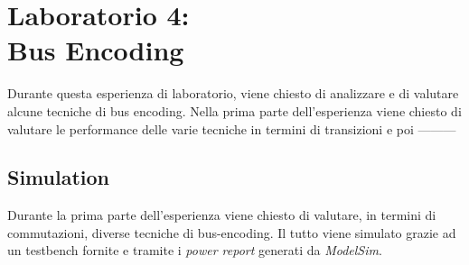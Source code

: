 \chapter{Laboratorio 4: \\Bus Encoding}
Durante questa esperienza di laboratorio, viene chiesto di analizzare e di valutare alcune tecniche di bus encoding. Nella prima parte dell'esperienza viene chiesto di valutare le performance delle varie tecniche in termini di transizioni e poi --------- %
\section{Simulation}
Durante la prima parte dell'esperienza viene chiesto di valutare, in termini di commutazioni, diverse tecniche di bus-encoding. Il tutto viene simulato grazie ad un testbench fornite e tramite i \textit{power report} generati da \textit{ModelSim}.

